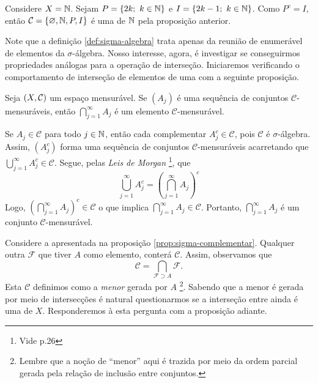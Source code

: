 \begin{example}
    Considere $X = \operatorname{\mathbb{N}}$. 
    Sejam $P =\{2k; \ k \in \operatorname{\mathbb{N}}\}$ e $I = \{2k - 1;\ k \in \operatorname{\mathbb{N}}\}$. 
    Como $P^c = I$, então $\mathcal{C} = \{\varnothing, \operatorname{\mathbb{N}}, P, I\}$ é uma \sigal de $\operatorname{\mathbb{N}}$ pela proposição anterior.
\end{example}
 
Note que a definição \ref{def:sigma-algebra} trata apenas da reunião de enumerável de elementos da $\sigma$-álgebra. 
Nosso interesse, agora, é investigar se conseguirmos propriedades análogas para a operação de interseção. 
Iniciaremos verificando o comportamento de interseção de elementos de uma \sigal com a seguinte proposição.

\begin{proposition}
\label{prop:interseção-elementos-sigmas}
    Seja $(X, \operatorname{\mathcal{C}})$ um espaço mensurável.
    Se $(A_j)$ é uma sequência  de conjuntos $\mathcal{C} $-mensuráveis, então $\displaystyle \bigcap_{j = 1}^\infty A_j$ é um elemento $\mathcal{C}$-mensurável.
\end{proposition}
\begin{prova}
    Se $A_j \in \mathcal{C}$ para todo $j \in \operatorname{\mathbb{N}}$, então cada complementar $A_j^c \in \mathcal{C}$, pois $\mathcal{C}$ é $\sigma$-álgebra. 
    Assim, $(A_j^c)$ forma uma sequência de conjuntos $\mathcal{C}$-mensuráveis acarretando que 
    $\displaystyle \bigcup_{j = 1}^\infty A_j^c \in \mathcal{C}$. 
    Segue, pelas \textit{Leis de Morgan}
    \footnote{Vide \supercite{elon}{p.26}}, que 
    $$
    \displaystyle \bigcup_{j = 1}^\infty A_j^c 
    = \left(\displaystyle \bigcap_{j = 1}^\infty A_j\right)^c
  	$$
	Logo, $\left(\displaystyle \bigcap_{j = 1}^\infty A_j\right)^c \in \mathcal{C}$ o que implica $\displaystyle \bigcap_{j = 1}^\infty A_j \in \mathcal{C}$. 
	Portanto, $\displaystyle \bigcap_{j = 1}^\infty A_j$ é um conjunto $\mathcal{C}$-mensurável.
\end{prova}

Considere a \sigal apresentada na proposição \ref{prop:sigma-complementar}. 
Qualquer outra \sigal $\mathcal{F}$ que tiver $A$ como elemento, conterá $\mathcal{C}$.
Assim, observamos que 
$$
\mathcal{C} = \displaystyle \bigcap_{\mathcal{F} \supset A} \mathcal{F}.
$$
Esta \sigal $\mathcal{C}$   definimos como a \textit{menor} \sigal gerada por $A$ 
%
\footnote{Lembre que a noção de \enquote{menor} aqui é trazida por meio da ordem parcial gerada pela relação de inclusão entre conjuntos.}.
%
Sabendo que a menor \sigal é gerada por meio de intersecções é natural questionarmos se a interseção entre \sigals ainda é uma \sigal de $X$.
Responderemos à esta pergunta com a proposição adiante.

